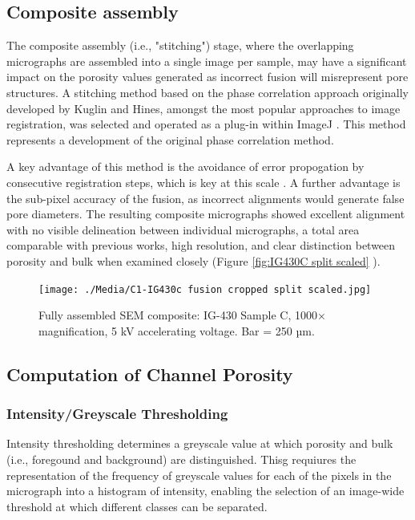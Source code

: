 \documentclass[3p,twocolumn]{elsarticle}
\begin{document}
\subsection{Composite assembly}

The composite assembly (i.e., "stitching") stage, where the overlapping
micrographs are assembled into a single image per sample, may have a significant
impact on the porosity values generated as incorrect fusion will misrepresent
pore structures. A stitching method based on the phase correlation approach
originally developed by Kuglin and Hines, amongst the most popular approaches to
image registration, was selected and operated as a plug-in within ImageJ
\citep{Kuglin1975, Preibisch2009}. This method represents a development of the
original phase correlation method\citep{Preibisch2009}.
	
A key advantage of this method is the avoidance of error propogation by
consecutive registration steps, which is key at this scale
\citep{Preibisch2009}. A further advantage is the sub-pixel accuracy of the
fusion, as incorrect alignments would generate false pore diameters. The
resulting composite micrographs showed excellent alignment with no visible
delineation between individual micrographs, a total area comparable with
previous works, high resolution, and clear distinction
between porosity and bulk when examined closely (Figure \ref{fig:IG430C split
scaled} \cite{Huang2019,Kane2011a}). 

	\begin{figure}
		\centering
		\texttt{[image: ./Media/C1-IG430c fusion cropped split scaled.jpg]}
		\caption{Fully assembled SEM composite: IG-430 Sample C, 1000×  magnification,
     5 kV accelerating voltage. Bar = 250 µm.}
		\label{fig:IG430C split scaled}
	\end{figure} 

	\subsection{Computation of Channel Porosity}
\subsubsection{Intensity/Greyscale Thresholding}
	
	Intensity thresholding determines a greyscale value at which porosity and bulk
	(i.e., foregound and background) are distinguished. Thisg requiures the
	representation of the frequency of greyscale values for each of the pixels in
	the micrograph into a histogram of intensity, enabling the selection of an
	image-wide threshold at which different classes can be separated.
\end{document}
